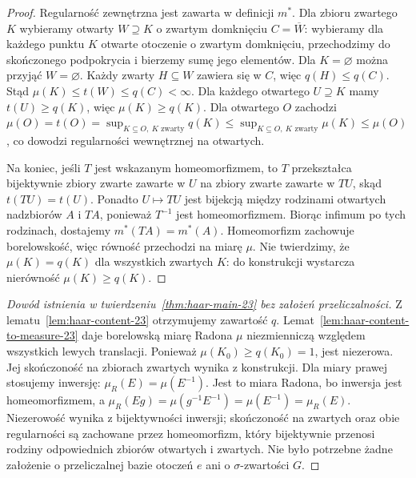 \begin{proof}
Regularność zewnętrzna jest zawarta w definicji $m^*$.
Dla zbioru zwartego $K$ wybieramy otwarty $W\supseteq K$
o zwartym domknięciu $C=\overline W$: wybieramy dla
każdego punktu $K$ otwarte otoczenie o zwartym
domknięciu, przechodzimy do skończonego podpokrycia
i bierzemy sumę jego elementów. Dla $K=\varnothing$
można przyjąć $W=\varnothing$. Każdy zwarty
$H\subseteq W$ zawiera się w $C$, więc
$q(H)\le q(C)$. Stąd
$\mu(K)\le t(W)\le q(C)<\infty$.
Dla każdego otwartego $U\supseteq K$ mamy
$t(U)\ge q(K)$, więc $\mu(K)\ge q(K)$.
Dla otwartego $O$ zachodzi
$\mu(O)=t(O)=\sup_{K\subseteq O,\ K\text{ zwarty}}q(K)
\le\sup_{K\subseteq O,\ K\text{ zwarty}}\mu(K)\le\mu(O)$,
co dowodzi regularności wewnętrznej na otwartych.

Na koniec, jeśli $T$ jest wskazanym homeomorfizmem,
to $T$ przekształca bijektywnie zbiory zwarte zawarte w $U$
na zbiory zwarte zawarte w $TU$, skąd $t(TU)=t(U)$.
Ponadto $U\mapsto TU$ jest bijekcją między rodzinami
otwartych nadzbiorów $A$ i $TA$, ponieważ
$T^{-1}$ jest homeomorfizmem. Biorąc infimum
po tych rodzinach, dostajemy $m^*(TA)=m^*(A)$.
Homeomorfizm zachowuje borelowskość, więc równość
przechodzi na miarę $\mu$. Nie twierdzimy, że
$\mu(K)=q(K)$ dla wszystkich zwartych $K$:
do konstrukcji wystarcza nierówność $\mu(K)\ge q(K)$.
\end{proof}

\begin{proof}[Dowód istnienia w twierdzeniu~\ref{thm:haar-main-23}
bez założeń przeliczalności]
Z lematu~\ref{lem:haar-content-23} otrzymujemy
zawartość $q$. Lemat~\ref{lem:haar-content-to-measure-23}
daje borelowską miarę Radona $\mu$ niezmienniczą
względem wszystkich lewych translacji.
Ponieważ $\mu(K_0)\ge q(K_0)=1$, jest niezerowa.
Jej skończoność na zbiorach zwartych wynika z konstrukcji.
Dla miary prawej stosujemy inwersję:
$\mu_R(E)=\mu(E^{-1})$.
Jest to miara Radona, bo inwersja jest homeomorfizmem,
a $\mu_R(Eg)=\mu(g^{-1}E^{-1})=\mu(E^{-1})=\mu_R(E)$.
Niezerowość wynika z bijektywności inwersji; skończoność
na zwartych oraz obie regularności są zachowane przez
homeomorfizm, który bijektywnie przenosi rodziny
odpowiednich zbiorów otwartych i zwartych.
Nie było potrzebne żadne założenie o przeliczalnej bazie
otoczeń $e$ ani o $\sigma$-zwartości $G$.
\end{proof}

